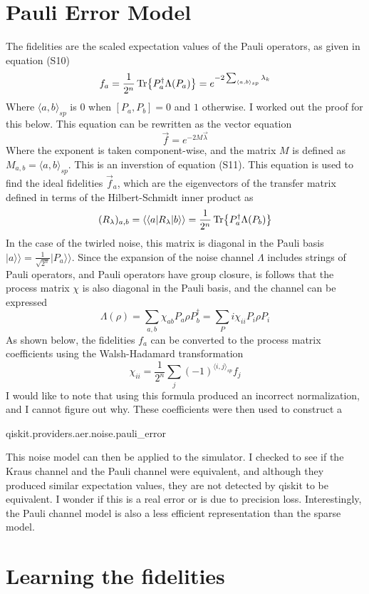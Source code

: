 \documentclass[11pt]{article}
\newcommand{\kket}[1]{\vert #1 \rangle  \rangle}
\newcommand{\bbra}[1]{\langle  \langle #1 \vert}
\begin{document}
\section*{Pauli Error Model}
The fidelities are the scaled expectation values of the Pauli operators, as given in equation (S10)
$$
f_a = \frac{1}{2^n}\Tr{P_a^\dagger \Lambda(P_a)} = e^{-2\sum_{\langle a,b \rangle_{sp}}\lambda_k}
$$
Where $\langle a,b \rangle_{sp}$ is $0$ when $[P_a, P_b] = 0$ and $1$ otherwise. I worked out the proof for this below. This equation can be rewritten as the vector equation
$$
\vec f = e^{-2M\vec \lambda}
$$
Where the exponent is taken component-wise, and the matrix $M$ is defined as $M_{a,b} = \langle a,b \rangle_{sp}$. This is an inverstion of equation (S11). This equation is used to find the ideal fidelities $\vec f_a$, which are the eigenvectors of the transfer matrix defined in terms of the Hilbert-Schmidt inner product as
$$
(R_\lambda)_{a,b} = \bbra{a} R_\lambda \kket{b} = \frac{1}{2^n}\Tr{P_a^\dagger \Lambda(P_b)}
$$
In the case of the twirled noise, this matrix is diagonal in the Pauli basis $\kket{a} = \frac{1}{\sqrt{2^n}} \kket{P_a}$. Since the expansion of the noise channel $\Lambda$ includes strings of Pauli operators, and Pauli operators have group closure, is follows that the process matrix $\chi$ is also diagonal in the Pauli basis, and the channel can be expressed
$$
\Lambda(\rho) = \sum_{a,b} \chi_{ab}P_a\rho P_b^\dagger = \sum_P{i} \chi_{ii} P_i \rho P_i
$$
As shown below, the fidelities $f_a$ can be converted to the process matrix coefficients using the Walsh-Hadamard transformation
$$
\chi_{ii} = \frac{1}{2^n}\sum_j (-1)^{\langle i,j \rangle_{sp}}f_j
$$
I would like to note that using this formula produced an incorrect normalization, and I cannot figure out why. These coefficients were then used to construct a
\begin{pyverbatim}
qiskit.providers.aer.noise.pauli_error
\end{pyverbatim}
This noise model can then be applied to the simulator. I checked to see if the Kraus channel and the Pauli channel were equivalent, and although they produced similar expectation values, they are not detected by qiskit to be equivalent. I wonder if this is a real error or is due to precision loss. Interestingly, the Pauli channel model is also a less efficient representation than the sparse model.

\section*{Learning the fidelities}
\end{document}
